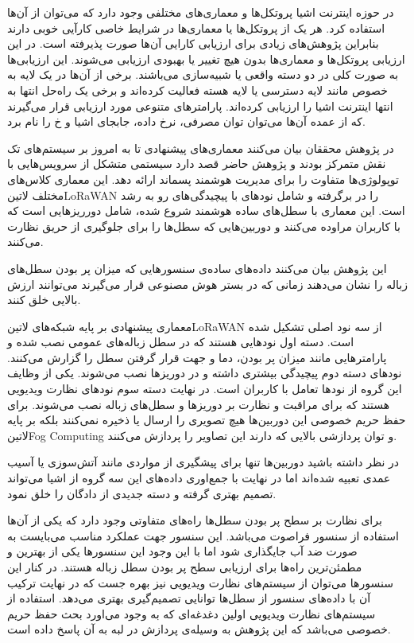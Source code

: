 

در حوزه اینترنت اشیا پروتکل‌ها و معماری‌های مختلفی وجود دارد که می‌توان از آن‌ها استفاده کرد. هر یک از پروتکل‌ها یا معماری‌ها در شرایط خاصی کارآیی خوبی دارند بنابراین پژوهش‌های زیادی برای ارزیابی کارایی آن‌ها صورت پذیرفته است.
در این ارزیابی پروتکل‌ها و معماری‌ها بدون هیچ تغییر یا بهبودی ارزیابی می‌شوند.
این ارزیابی‌ها به صورت کلی در دو دسته واقعی یا شبیه‌سازی می‌باشند. برخی از آن‌ها در یک لایه به خصوص مانند لایه دسترسی یا لایه هسته فعالیت کرده‌اند و برخی یک راه‌حل انتها به انتها اینترنت اشیا را ارزیابی کرده‌اند.
پارامترهای متنوعی مورد ارزیابی قرار می‌گیرند که از عمده آن‌ها می‌توان توان مصرفی، نرخ داده، جابجای اشیا و ‌خ را نام برد.


در پژوهش  محققان بیان می‌کنند معماری‌های پیشنهادی تا به امروز بر سیستم‌های تک نقش متمرکز بودند و پژوهش حاضر قصد دارد سیستمی متشکل از سرویس‌هایی با توپولوژی‌ها متفاوت را
برای مدیریت هوشمند پسماند ارائه دهد. این معماری کلاس‌های مختلف ‌لاتین{LoRaWAN} را در برگرفته و شامل نودهای با پیچیدگی‌های رو به رشد است.
این معماری با سطل‌های ساده هوشمند شروع شده، شامل دورریزهایی است که با کاربران مراوده می‌کنند و دوربین‌هایی که سطل‌ها را برای جلوگیری از حریق نظارت می‌کنند.

این پژوهش بیان می‌کنند داده‌های ساده‌ی سنسورهایی که میزان پر بودن سطل‌های زباله را نشان می‌دهند زمانی که در بستر هوش مصنوعی قرار می‌گیرند می‌توانند ارزش بالایی خلق کنند.

معماری پیشنهادی بر پایه شبکه‌های ‌لاتین{LoRaWAN} از سه نود اصلی تشکیل شده است. دسته اول نودهایی هستند که در سطل زباله‌های عمومی نصب شده و پارامترهایی مانند
میزان پر بودن، دما و جهت قرار گرفتن سطل را گزارش می‌کنند. نودهای دسته دوم پیچیدگی بیشتری داشته و در دوریزها نصب می‌شوند. یکی از وظایف این گروه از نودها تعامل با کاربران است.
در نهایت دسته سوم نودهای نظارت ویدیویی هستند که برای مراقبت و نظارت بر دوریزها و سطل‌های زباله نصب می‌شوند. برای حفظ حریم خصوصی این دوربین‌ها هیچ تصویری را ارسال یا ذخیره نمی‌کنند
بلکه بر پایه ‌لاتین{Fog Computing} و توان پردازشی بالایی که دارند این تصاویر را پردازش می‌کنند.

در نظر داشته باشید دوربین‌ها تنها برای پیشگیری از مواردی مانند آتش‌سوزی یا آسیب عمدی تعبیه شده‌اند اما در نهایت با جمع‌اوری داده‌های این سه گروه از اشیا می‌تواند تصمیم بهتری گرفته و دسته جدیدی از دادگان را خلق نمود.

برای نظارت بر سطح پر بودن سطل‌ها راه‌های متفاوتی وجود دارد که یکی از آن‌ها استفاده از سنسور فراصوت می‌باشد. این سنسور جهت عملکرد مناسب می‌بایست به صورت ضد آب جایگذاری شود اما با این وجود
این سنسورها یکی از بهترین و مطمئن‌ترین راه‌ها برای ارزیابی سطح پر بودن سطل زباله هستند. در کنار این سنسورها می‌توان از سیستم‌های نظارت ویدیویی نیز بهره جست که در نهایت ترکیب آن با داده‌های سنسور
از سطل‌ها توانایی تصمیم‌گیری بهتری می‌دهد. استفاده از سیستم‌های نظارت ویدیویی اولین دغدغه‌ای که به وجود می‌اورد بحث حفظ حریم خصوصی می‌باشد که این پژوهش به وسیله‌ی پردازش در لبه به آن پاسخ داده است.


